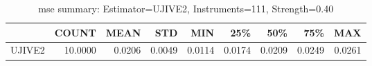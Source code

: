 \begin{table}[ht]
\centering
\caption{mse summary: Estimator=UJIVE2, Instruments=111, Strength=0.40}
\begin{tabular}{lrrrrrrrr}
\toprule
 & COUNT & MEAN & STD & MIN & 25\% & 50\% & 75\% & MAX \\
\midrule
UJIVE2 & 10.0000 & 0.0206 & 0.0049 & 0.0114 & 0.0174 & 0.0209 & 0.0249 & 0.0261 \\
\bottomrule
\end{tabular}
\end{table}
